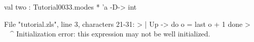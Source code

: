 \runverbatimfalse
{}
\begin{RunVerbatimMsg}
val two : Tutorial0033.modes * 'a -D-> int
\end{RunVerbatimMsg}
\begin{RunVerbatimErr}
File "tutorial.zls", line 3, characters 21-31:
>      | Up -> do o = last o + 1 done
>                     ^^^^^^^^^^
Initialization error: this expression may not be well initialized.
\end{RunVerbatimErr}
